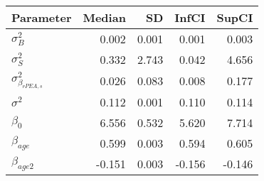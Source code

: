 \begin{table}[ht]
\centering
\begin{tabular}{lrrrr}
  \hline
Parameter & Median & SD & InfCI & SupCI \\ 
  \hline
$\sigma^{2}_{B}$ & 0.002 & 0.001 & 0.001 & 0.003 \\ 
  $\sigma^{2}_{S}$ & 0.332 & 2.743 & 0.042 & 4.656 \\ 
  $\sigma^{2}_{\beta_{rPEA,s}}$ & 0.026 & 0.083 & 0.008 & 0.177 \\ 
  $\sigma^{2}$ & 0.112 & 0.001 & 0.110 & 0.114 \\ 
  $\beta_{0}$ & 6.556 & 0.532 & 5.620 & 7.714 \\ 
  $\beta_{age}$ & 0.599 & 0.003 & 0.594 & 0.605 \\ 
  $\beta_{age2}$ & -0.151 & 0.003 & -0.156 & -0.146 \\ 
   \hline
\end{tabular}
\end{table}
